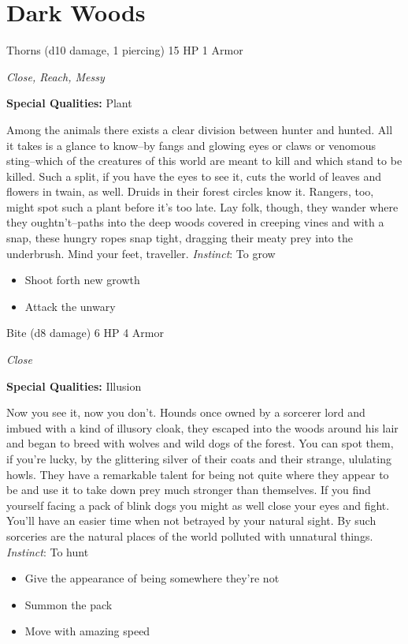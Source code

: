 \section{Dark Woods}

\HRule
{}

Thorns (d10 damage, 1 piercing)\hspace*{\fill} 15 HP 1 Armor

\emph{Close, Reach, Messy}

\textbf{Special Qualities:}
Plant

\HRule
Among the animals there exists a clear division between hunter and hunted. All it takes is a glance to know--by fangs and glowing eyes or claws or venomous sting--which of the creatures of this world are meant to kill and which stand to be killed. Such a split, if you have the eyes to see it, cuts the world of leaves and flowers in twain, as well. Druids in their forest circles know it. Rangers, too, might spot such a plant before it's too late. Lay folk, though, they wander where they oughtn't--paths into the deep woods covered in creeping vines and with a snap, these hungry ropes snap tight, dragging their meaty prey into the underbrush. Mind your feet, traveller. \emph{Instinct}: To grow
\begin{itemize}
\item Shoot forth new growth
\item Attack the unwary
\end{itemize}
\newpage
\HRule
{}

Bite (d8 damage)\hspace*{\fill} 6 HP 4 Armor

\emph{Close}

\textbf{Special Qualities:}
Illusion

\HRule
Now you see it, now you don't. Hounds once owned by a sorcerer lord and imbued with a kind of illusory cloak, they escaped into the woods around his lair and began to breed with wolves and wild dogs of the forest. You can spot them, if you're lucky, by the glittering silver of their coats and their strange, ululating howls. They have a remarkable talent for being not quite where they appear to be and use it to take down prey much stronger than themselves. If you find yourself facing a pack of blink dogs you might as well close your eyes and fight. You'll have an easier time when not betrayed by your natural sight. By such sorceries are the natural places of the world polluted with unnatural things. \emph{Instinct}: To hunt
\begin{itemize}
\item Give the appearance of being somewhere they're not
\item Summon the pack
\item Move with amazing speed
\end{itemize}
\newpage
\HRule
{}

